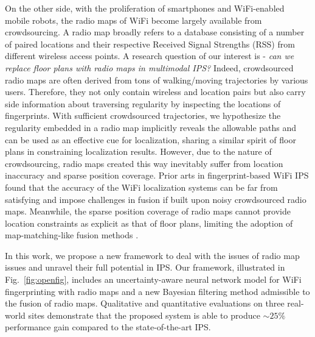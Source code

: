 On the other side, with the proliferation of smartphones and WiFi-enabled mobile robots, the radio maps of WiFi become largely available from crowdsourcing. A radio map broadly refers to a database 
consisting of a number of paired locations and their respective Received Signal Strengths (RSS) from different wireless access points. A research question of our interest is - \emph{can we replace floor plans with radio maps in multimodal IPS?} 
Indeed, crowdsourced radio maps are often derived from tons of walking/moving trajectories by various users. Therefore, they not only contain wireless and location pairs but also carry side information about traversing regularity by inspecting the locations of fingerprints. With sufficient crowdsourced trajectories, we hypothesize the regularity embedded in a radio map implicitly reveals the allowable paths and can be used as an effective cue for localization, sharing a similar spirit of floor plans in constraining localization results.
However, due to the nature of crowdsourcing, radio maps created this way inevitably suffer from location inaccuracy and sparse position coverage. Prior arts in fingerprint-based WiFi IPS \cite{huang2019online} found that the accuracy of the WiFi localization systems can be far from satisfying and impose challenges in fusion if built upon noisy crowdsourced radio maps. Meanwhile, the sparse position coverage of radio maps cannot provide location constraints as explicit as that of floor plans, limiting the adoption of map-matching-like fusion methods \cite{xiao2014lightweight,herath2021fusiondhl}.  

In this work, we propose a new framework to deal with the issues of radio map issues and unravel their full potential in IPS. Our framework, illustrated in Fig.~\ref{fig:openfig}, includes an uncertainty-aware neural network model for WiFi fingerprinting with radio maps and a new Bayesian filtering method admissible to the fusion of radio maps. Qualitative and quantitative evaluations on three real-world sites demonstrate that the proposed system is able to
produce $\sim25\%$ performance gain compared to the state-of-the-art IPS.






